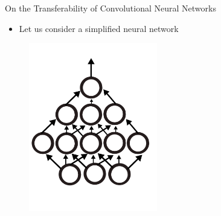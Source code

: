 \documentclass{beamer}
\begin{document}
\begin{frame}{On the Transferability of Convolutional Neural Networks}
	
	\bigskip

	\begin{itemize}
		\item Let us consider a simplified neural network
	\end{itemize}

	\bigskip

	\begin{figure}
		\includegraphics[width=0.5\textwidth]{figures/mlp.pdf}
	\end{figure}

\end{frame}

\end{document}
